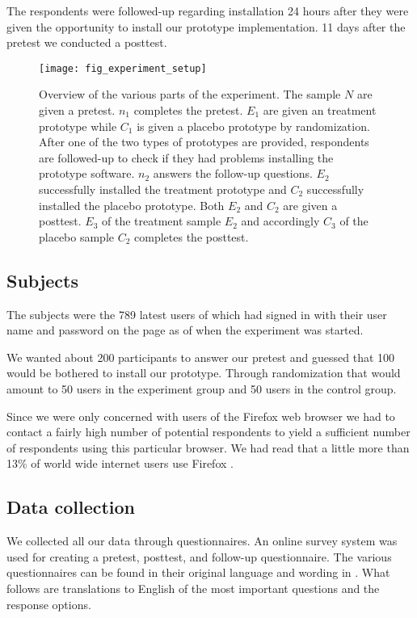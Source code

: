 The respondents were followed-up regarding installation 24 hours after they
were given the opportunity to install our prototype implementation. 11 days
after the pretest we conducted a posttest.

\begin{figure}
  \texttt{[image: fig\_experiment\_setup]}
  \caption[Experiment Overview]{
    Overview of the various parts of the experiment. The sample $N$
    are given a pretest. $n_1$ completes the pretest. $E_1$ are given
    an treatment prototype while $C_1$ is given a placebo
    prototype by randomization.
    After one of the two types of prototypes are provided, respondents are
    followed-up to check if they had problems installing the prototype
    software. $n_2$ answers the follow-up questions.
    $E_2$ successfully installed the treatment prototype and $C_2$
    successfully installed the placebo prototype. Both $E_2$ and $C_2$ are
    given a posttest.
    $E_3$ of the treatment sample $E_2$ and accordingly $C_3$ of the
    placebo sample $C_2$ completes the posttest.
  }
  \label{figure:fig.experiment.setup}
\end{figure}

\subsection{Subjects}

The subjects were the 789 latest users of \urort{} which had
signed in with their user name and password on the \urort{} page as of when
the experiment was started.

We wanted about 200 participants to answer our pretest and guessed that
100 would be bothered to install our prototype. Through randomization
that would amount to 50 users in the experiment group and 50 users
in the control group.

Since we were only concerned with users of the Firefox web browser we had to
contact a fairly high number of potential respondents to yield a sufficient
number of respondents using this particular browser. We had read that a little
more than 13\% of world wide internet users use Firefox \citep{onestat08}.

\subsection{Data collection}

We collected all our data through questionnaires. An online survey system was
used for creating a pretest, posttest, and follow-up questionnaire.
The various
questionnaires can be found in their original language and wording in
. What follows are translations to English
of the most important questions and the response options.

